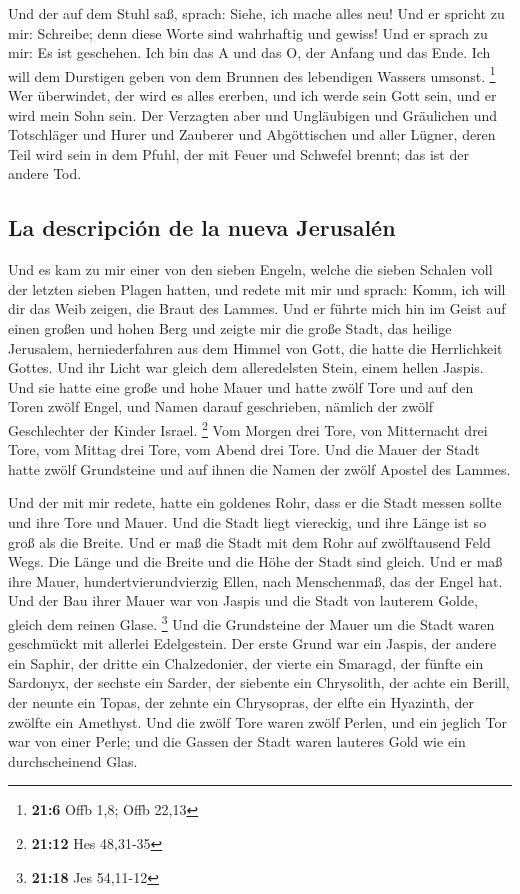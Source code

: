  Und der auf dem Stuhl saß, sprach: Siehe, ich mache alles
neu! Und er spricht zu mir: Schreibe; denn diese Worte sind wahrhaftig
und gewiss!  Und er sprach zu mir: Es ist geschehen. Ich
bin das A und das O, der Anfang und das Ende. Ich will dem Durstigen
geben von dem Brunnen des lebendigen Wassers umsonst. \footnote{\textbf{21:6}
  Offb 1,8; Offb 22,13}  Wer überwindet, der wird es alles
ererben, und ich werde sein Gott sein, und er wird mein Sohn sein.
 Der Verzagten aber und Ungläubigen und Gräulichen und
Totschläger und Hurer und Zauberer und Abgöttischen und aller Lügner,
deren Teil wird sein in dem Pfuhl, der mit Feuer und Schwefel brennt;
das ist der andere Tod.

\hypertarget{la-descripciuxf3n-de-la-nueva-jerusaluxe9n}{%
\subsection{La descripción de la nueva
Jerusalén}\label{la-descripciuxf3n-de-la-nueva-jerusaluxe9n}}

 Und es kam zu mir einer von den sieben Engeln, welche die
sieben Schalen voll der letzten sieben Plagen hatten, und redete mit mir
und sprach: Komm, ich will dir das Weib zeigen, die Braut des Lammes.
 Und er führte mich hin im Geist auf einen großen und
hohen Berg und zeigte mir die große Stadt, das heilige Jerusalem,
herniederfahren aus dem Himmel von Gott,  die hatte die
Herrlichkeit Gottes. Und ihr Licht war gleich dem alleredelsten Stein,
einem hellen Jaspis.  Und sie hatte eine große und hohe
Mauer und hatte zwölf Tore und auf den Toren zwölf Engel, und Namen
darauf geschrieben, nämlich der zwölf Geschlechter der Kinder Israel.
\footnote{\textbf{21:12} Hes 48,31-35}  Vom Morgen drei
Tore, von Mitternacht drei Tore, vom Mittag drei Tore, vom Abend drei
Tore.  Und die Mauer der Stadt hatte zwölf Grundsteine
und auf ihnen die Namen der zwölf Apostel des Lammes.

 Und der mit mir redete, hatte ein goldenes Rohr, dass er
die Stadt messen sollte und ihre Tore und Mauer.  Und die
Stadt liegt viereckig, und ihre Länge ist so groß als die Breite. Und er
maß die Stadt mit dem Rohr auf zwölftausend Feld Wegs. Die Länge und die
Breite und die Höhe der Stadt sind gleich.  Und er maß
ihre Mauer, hundertvierundvierzig Ellen, nach Menschenmaß, das der Engel
hat.  Und der Bau ihrer Mauer war von Jaspis und die
Stadt von lauterem Golde, gleich dem reinen Glase. \footnote{\textbf{21:18}
  Jes 54,11-12}  Und die Grundsteine der Mauer um die
Stadt waren geschmückt mit allerlei Edelgestein. Der erste Grund war ein
Jaspis, der andere ein Saphir, der dritte ein Chalzedonier, der vierte
ein Smaragd,  der fünfte ein Sardonyx, der sechste ein
Sarder, der siebente ein Chrysolith, der achte ein Berill, der neunte
ein Topas, der zehnte ein Chrysopras, der elfte ein Hyazinth, der
zwölfte ein Amethyst.  Und die zwölf Tore waren zwölf
Perlen, und ein jeglich Tor war von einer Perle; und die Gassen der
Stadt waren lauteres Gold wie ein durchscheinend Glas.


